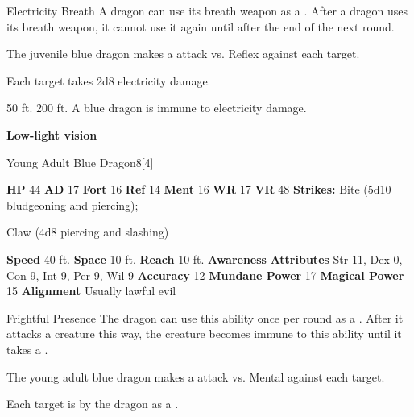     \begin{freeability}{Electricity Breath}
      A dragon can use its breath weapon as a .
      After a dragon uses its breath weapon, it cannot use it again until after the end of the next round.
      \par The juvenile blue dragon makes a  attack
        vs. Reflex against each target.
    
    \hit Each target takes 2d8 electricity damage.
    \end{freeability}
  
      
       50 ft.
     200 ft.
     A blue dragon is immune to electricity damage.
    \par\noindent\textbf{Low-light vision}
  

  \begin{monsubsection}{Young Adult Blue Dragon}{8}[4]
    \vspace{-1em}\vspace{-1em}
    \vspace{0em}

    
    

    \begin{spellcontent}
      \begin{spelltargetinginfo}
        \pari \textbf{HP} 44 \monsep
          \textbf{AD} 17 \monsep
          \textbf{Fort} 16 \monsep
          \textbf{Ref} 14 \monsep
          \textbf{Ment} 16
        \pari \textbf{WR} 17 \monsep
        \textbf{VR} 48
        \pari \textbf{Strikes:}
            Bite  (5d10 bludgeoning and piercing);
\par Claw  (4d8 piercing and slashing)
      \end{spelltargetinginfo}
    \end{spellcontent}
    \begin{monsterfooter}
      \pari \textbf{Speed} 40 ft. \monsep
        \textbf{Space} 10 ft. \monsep
        \textbf{Reach} 10 ft.
      \pari \textbf{Awareness} 
      \pari \textbf{Attributes}
        Str 11, Dex 0,
        Con 9, Int 9,
        Per 9, Wil 9
      \pari \textbf{Accuracy} 12 \monsep
        \textbf{Mundane Power} 17 \monsep
      \textbf{Magical Power} 15
      \pari \textbf{Alignment} Usually lawful evil
    \end{monsterfooter}
  \end{monsubsection}
  \begin{freeability}{Frightful Presence}
      The dragon can use this ability once per round as a .
      After it attacks a creature this way, the creature becomes immune to this ability until it takes a .
      \par The young adult blue dragon makes a  attack
        vs. Mental against each target.
    
    \hit Each target is  by the dragon as a .
    \end{freeability}
  

